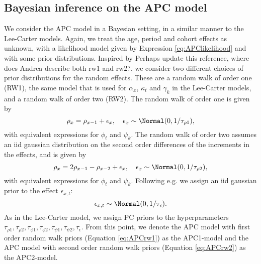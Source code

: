 \subsection{Bayesian inference on the APC model}
\label{sec:BayesianInferenceAPC}
We consider the APC model in a Bayesian setting, in a similar manner to the Lee-Carter models. Again, we treat the age, period and cohort effects as unknown, with a likelihood model given by Expression \ref{eq:APClikelihood} and with some prior distributions. Inspired by \parencite{RieblerThesis2010} \textcolor{myDarkGreen}{Perhaps update this reference, where does Andrea describe both rw1 and rw2?}, we consider two different choices of prior distributions for the random effects. These are a random walk of order one (RW1), the same model that is used for $\alpha_x$, $\kappa_t$ and $\gamma_k$ in the Lee-Carter models, and a random walk of order two (RW2). The random walk of order one is given by
\begin{equation}
    \rho_x = \rho_{x-1} + \epsilon_x, \quad \epsilon_x \sim \Normal(0,1/\tau_{\rho1}),
    \label{eq:APCrw1}
\end{equation}
with equivalent expressions for $\phi_t$ and $\psi_k$. The random walk of order two assumes an iid gaussian distribution on the second order differences of the increments in the effects, and is given by
\begin{equation}
    \rho_x = 2\rho_{x-1} - \rho_{x-2} + \epsilon_x, \quad \epsilon_x \sim \Normal(0, 1/\tau_{\rho2}),
    \label{eq:APCrw2}
\end{equation}
with equivalent expressions for $\phi_t$ and $\psi_k$. 
Following e.g. \textcite{Besag1995} we assign an iid gaussian prior to the effect $\epsilon_{x,t}$:
\begin{equation}
    \epsilon_{x,t} \sim \Normal(0,1/\tau_\epsilon).
\end{equation}
As in the Lee-Carter model, we assign PC priors to the hyperparameters $\tau_{\rho 1}, \tau_{\rho 2}, \tau_{\phi 1}, \tau_{\phi 2}, \tau_{\psi 1}, \tau_{\psi 2}, \tau_\epsilon$. From this point, we denote the APC model with first order random walk priors (Equation \ref{eq:APCrw1}) as the APC1-model and the APC model with second order random walk priors (Equation \ref{eq:APCrw2}) as the APC2-model.


